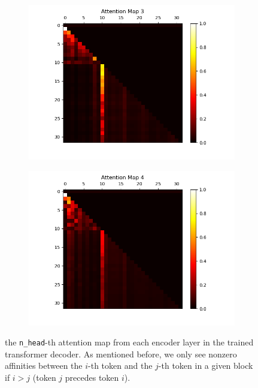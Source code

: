 \documentclass[10pt]{article}
\newcommand{\code}[1]{\texttt{#1}}
\theoremstyle{definition}
\begin{document}
\begin{figure}[H]
\begin{subfigure}[b]{0.35\textwidth}
        \includegraphics[width=\textwidth]{../data/plots/part2/attention_map_3.png}
        \label{subfig:am3}
    \end{subfigure}
    \begin{subfigure}[b]{0.35\textwidth}
        \centering
        \includegraphics[width=\textwidth]{../data/plots/part2/attention_map_4.png}
        \label{subfig:am4}
    \end{subfigure}
\caption{the \code{n\_head}-th attention map from each encoder layer in the trained transformer decoder. As mentioned before, we only see nonzero affinities between the $i$-th token and the $j$-th token in a given block if $i > j$ (token $j$ precedes token $i$).}
\end{figure}
\end{document}
